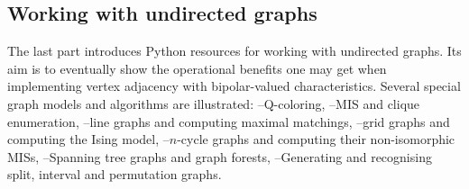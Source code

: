 % 
%
%

\begin{partbacktext}
\part{Working with undirected graphs}
\noindent The last part introduces Python resources for working with undirected graphs. Its aim is to eventually show the operational benefits one may get when implementing vertex adjacency with bipolar-valued characteristics. Several special graph models and algorithms are illustrated: --Q-coloring, --MIS and clique enumeration, --line graphs and computing maximal matchings, --grid graphs and computing the Ising model, --$n$-cycle graphs and computing their non-isomorphic MISs, --Spanning tree graphs and graph forests, --Generating and recognising split, interval and permutation graphs.
\end{partbacktext}